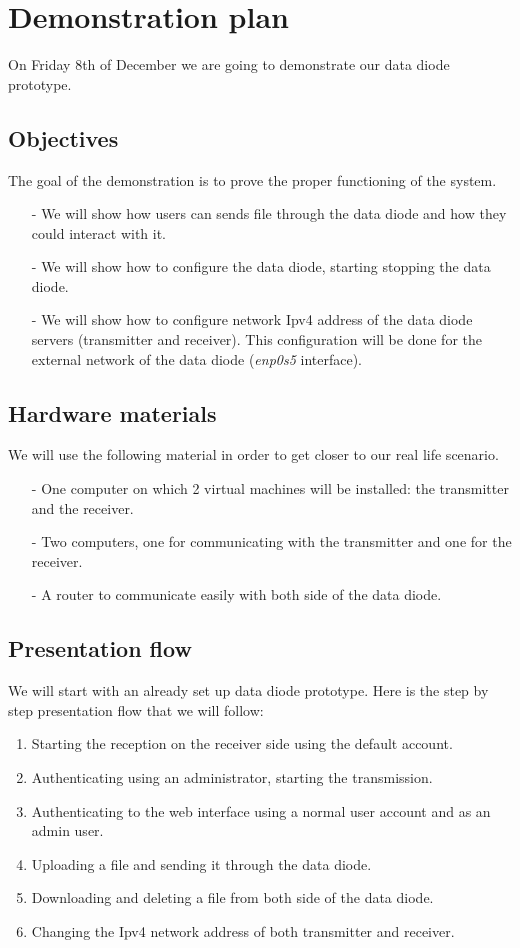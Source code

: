 \documentclass[a4paper,10pt]{article}
\begin{document}
\section{Demonstration plan}
On Friday 8th of December we are going to demonstrate our data diode prototype.
\subsection{Objectives}
The goal of the demonstration is to prove the proper functioning of the system. 
\begin{enumerate}
\item[-] We will show how users can sends file through the data diode and how they could interact with it.
\item[-] We will show how to configure the data diode, starting stopping the data diode.
\item[-] We will show how to configure network Ipv4 address of the data diode servers (transmitter and receiver). This configuration will be done for the external network of the data diode (\emph{enp0s5} interface).
\end{enumerate}

\subsection{Hardware materials}
We will use the following material in order to get closer to our real life scenario.
\begin{enumerate}
\item[-] One computer on which 2 virtual machines will be installed: the transmitter and the receiver.
\item[-] Two computers, one for communicating with the transmitter and one for the receiver.
\item[-] A router to communicate easily with both side of the data diode.
\end{enumerate}
 
\subsection{Presentation flow}
We will start with an already set up data diode prototype. Here is the step by step presentation flow that we will follow:
\begin{enumerate}
\item Starting the reception on the receiver side using the default account.
\item Authenticating using an administrator, starting the transmission.
\item Authenticating to the web interface using a normal user account and as an admin user.
\item Uploading a file and sending it through the data diode.
\item Downloading and deleting a file from both side of the data diode.
\item Changing the Ipv4 network address of both transmitter and receiver.
\end{enumerate}
 
\end{document}
